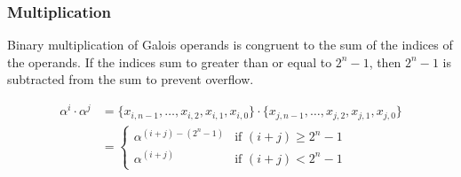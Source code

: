 \subsubsection{Multiplication} Binary multiplication of Galois operands is
congruent to the sum of the indices of the operands. If the indices sum to
greater than or equal to $2^{n}-1$, then $2^{n}-1$ is subtracted from the sum
to prevent overflow.

    \begin{align*}
        \alpha^{i} \cdot \alpha^{j} & = \{ x_{i, n-1}, \ldots, x_{i, 2}, x_{i,
        1}, x_{i, 0} \} \cdot \{x_{j, n-1}, \ldots, x_{j, 2}, x_{j, 1}, x_{j,
        0}\} \\
        & = \begin{cases}
                \alpha^{(i + j) - (2^{n}-1)} & \text{if $(i + j) \geq 2^{n}-1$}
                \\
                \alpha^{(i + j)} & \text{if $(i + j) < 2^{n}-1$}
            \end{cases}
    \end{align*}
